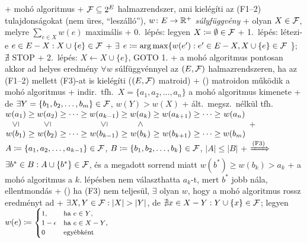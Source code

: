
+ \alg mohó algoritmus
  + \DataIn $\mathcal{F} \subseteq 2^E$ halmazrendszer, ami kielégíti az
    (F1--2) tulajdonságokat (nem üres, ``leszálló''), $w\colon E \to
    \mathbb{R}^+$ \emph{súlyfüggvény}
  + \DataOut olyan $X \in \mathcal{F}$, melyre $\sum_{e \in X} w(e)$ maximális
  + 0.~lépés: legyen $X \coloneqq \emptyset \in \mathcal{F}$
  + 1.~lépés: létezi-e $ e \in E - X: X \cup \{ e \} \in \mathcal{F}$
    + $\exists$ \RA $e \coloneqq \operatorname*{arg\,max} \{ w(e') : e' \in E - X, X
    \cup \{ e \} \in \mathcal{F}$ \}; $\nexists$ \RA STOP
  + 2.~lépés: $X \gets X \cup \{ e \}$, GOTO 1.
+ \thm a mohó algoritmus pontosan akkor ad helyes eredmény $\forall w$
  súlfüggvénnyel az $(E, \mathcal{F})$ halmazrendszeren, ha az (F1--2) mellett
  (F3)-at is kielégíti ($(E, \mathcal{F})$ matroid)
  + \proof (\LA) matroidon működik a mohó algoritmus
    + indir.~tfh.~$X = \{a_1, a_2, \ldots, a_n\}$ a mohó algoritmus
      kimenete
    + de $\exists Y = \{b_1, b_2, \ldots, b_m\} \in \mathcal{F}$, $w(Y) >
      w(X)$
    + ált.~megsz.~nélkül tfh.~{\footnotesize$\begin{array}{@{}*{10}{c@{\;}}c@{}}
        w(a_1) & \ge & w(a_2) & \ge\cdots\ge & w(a_{k - 1}) & \ge & w(a_k) & \ge & w(a_{k + 1})
        & \ge\cdots\ge & w(a_n) \\
        \vertle & & \vertle & & \vertle & & \vertgt & & & & \\
        w(b_1) & \ge & w(b_2) & \ge\cdots\ge & w(b_{k - 1}) & \ge & w(b_k) & \ge & w(b_{k + 1})
        & \ge\cdots\ge & w(b_m)
      \end{array}$}
    + $A \coloneqq \{ a_1, a_2, \ldots, a_{k - 1} \} \in \mathcal{F}$, $B \coloneqq \{
      b_1, b_2, \ldots, b_k \} \in \mathcal{F}$, $\lvert A \rvert \le \lvert B \rvert$
      + $\xRightarrow{\text{(F3)}}$ $\exists b^* \in B : A \cup \{ b^* \}
        \in \mathcal{F}$, és a megadott sorrend miatt $w(b^*) \ge w(b_k) > a_k$
      + a mohó algoritmus a $k$. lépésben nem választhatta $a_k$-t,
        mert $b^*$ jobb nála, ellentmondás
  + (\RA) ha (F3) nem teljesül, $\exists$ olyan $w$, hogy a mohó
    algoritmus rossz eredményt ad
    + $\exists X, Y \in \mathcal{F} : \lvert X \rvert > \lvert Y \rvert$, de
      $\nexists x \in X - Y : Y \cup \{ x \} \in \mathcal{F}$;
      legyen $w(e) \coloneqq \text{\footnotesize$\begin{cases}
        1, &\text{ha $e \in Y$,} \\
        1 - \epsilon &\text{ha $e \in X - Y$,} \\
        0 & \text{egyébként}
      \end{cases}$}$
